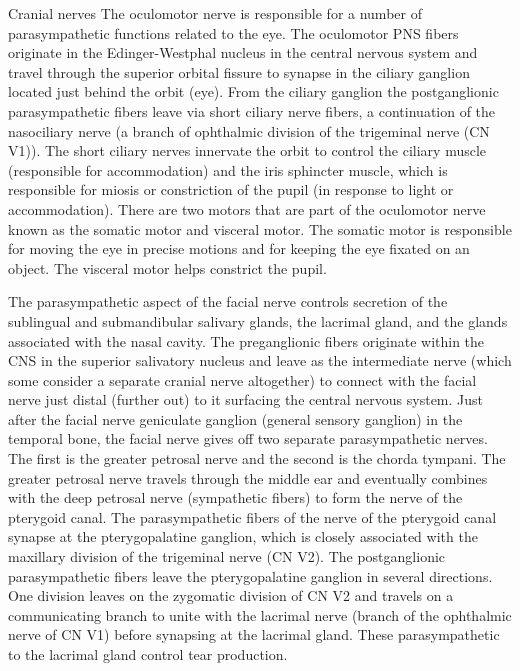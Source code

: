 Cranial nerves
The oculomotor nerve is responsible for a number of parasympathetic functions related to the eye. The oculomotor PNS fibers originate in the Edinger-Westphal nucleus in the central nervous system and travel through the superior orbital fissure to synapse in the ciliary ganglion located just behind the orbit (eye). From the ciliary ganglion the postganglionic parasympathetic fibers leave via short ciliary nerve fibers, a continuation of the nasociliary nerve (a branch of ophthalmic division of the trigeminal nerve (CN V1)). The short ciliary nerves innervate the orbit to control the ciliary muscle (responsible for accommodation) and the iris sphincter muscle, which is responsible for miosis or constriction of the pupil (in response to light or accommodation). There are two motors that are part of the oculomotor nerve known as the somatic motor and visceral motor. The somatic motor is responsible for moving the eye in precise motions and for keeping the eye fixated on an object. The visceral motor helps constrict the pupil.

The parasympathetic aspect of the facial nerve controls secretion of the sublingual and submandibular salivary glands, the lacrimal gland, and the glands associated with the nasal cavity. The preganglionic fibers originate within the CNS in the superior salivatory nucleus and leave as the intermediate nerve (which some consider a separate cranial nerve altogether) to connect with the facial nerve just distal (further out) to it surfacing the central nervous system. Just after the facial nerve geniculate ganglion (general sensory ganglion) in the temporal bone, the facial nerve gives off two separate parasympathetic nerves. The first is the greater petrosal nerve and the second is the chorda tympani. The greater petrosal nerve travels through the middle ear and eventually combines with the deep petrosal nerve (sympathetic fibers) to form the nerve of the pterygoid canal. The parasympathetic fibers of the nerve of the pterygoid canal synapse at the pterygopalatine ganglion, which is closely associated with the maxillary division of the trigeminal nerve (CN V2). The postganglionic parasympathetic fibers leave the pterygopalatine ganglion in several directions. One division leaves on the zygomatic division of CN V2 and travels on a communicating branch to unite with the lacrimal nerve (branch of the ophthalmic nerve of CN V1) before synapsing at the lacrimal gland. These parasympathetic to the lacrimal gland control tear production.


